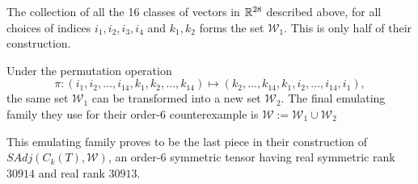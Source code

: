\documentclass[../Lael_John_MasterThesis_Draft.tex]{subfiles}
\begin{document}
The collection of all the 16 classes of vectors in $\mathbb{R}^{28}$ described above, for all choices of indices $i_1, i_2, i_3, i_4$ and $k_1, k_2$ forms the set $\mathcal{W}_1$. This is only half of their construction.

Under the permutation operation $$\pi: (i_1, i_2, \ldots, i_{14}, k_1, k_2, \ldots, k_{14}) \mapsto (k_2, \ldots, k_{14}, k_1, i_2, \ldots, i_{14}, i_1),$$ the same set $\mathcal{W}_1$ can be transformed into a new set $\mathcal{W}_2$. The final emulating family they use for their order-$6$ counterexample is $\mathcal{W}:= \mathcal{W}_1 \cup \mathcal{W}_2$

This emulating family proves to be the last piece in their construction of $SAdj(C_k(T), \mathcal{W})$, an order-$6$ symmetric tensor having real symmetric rank $30914$ and real rank $30913$. 
\end{document}
